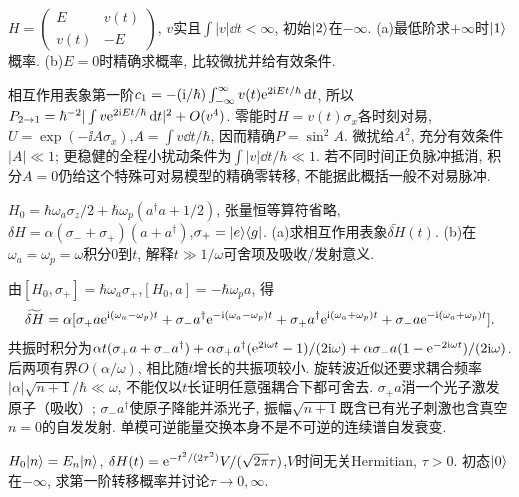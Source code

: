 \begin{exercise}
$H=\left(\begin{smallmatrix}E&v(t)\\v(t)&-E\end{smallmatrix}\right)$, $v$实且$\int|v|\dd t<\infty$, 初始$\lvert 2\rangle$在$-\infty$. (a)最低阶求$+\infty$时$\lvert 1\rangle$概率. (b)$E=0$时精确求概率, 比较微扰并给有效条件.
\end{exercise}
\begin{solution}
相互作用表象第一阶$c_1=-(\mathrm i/\hbar)\int_{-\infty}^\infty v(t)\mathrm e^{2\mathrm i Et/\hbar}\,\mathrm d t$, 所以$P_{2\to1}=\hbar^{-2}|\int v\mathrm e^{2\mathrm i Et/\hbar}\,\mathrm d t|^2+O(v^4)$. 零能时$H=v(t)\sigma_x$各时刻对易, $U=\exp(-\ii A\sigma_x)$,$A=\int v\dd t/\hbar$, 因而精确$P=\sin^2A$. 微扰给$A^2$, 充分有效条件$|A|\ll1$; 更稳健的全程小扰动条件为$\int|v|\dd t/\hbar\ll1$. 若不同时间正负脉冲抵消, 积分$A=0$仍给这个特殊可对易模型的精确零转移, 不能据此概括一般不对易脉冲.
\end{solution}
\begin{exercise}
$H_0=\hbar\omega_a\sigma_z/2+\hbar\omega_p(a^\dagger a+1/2)$, 张量恒等算符省略, $\delta H=\alpha(\sigma_-+\sigma_+)(a+a^\dagger)$,$\sigma_+=\lvert e\rangle\langle g\rvert$. (a)求相互作用表象$\widetilde{\delta H}(t)$. (b)在$\omega_a=\omega_p=\omega$积分$0$到$t$, 解释$t\gg1/\omega$可舍项及吸收/发射意义.
\end{exercise}
\begin{solution}
由$[H_0,\sigma_+]=\hbar\omega_a\sigma_+$,$[H_0,a]=-\hbar\omega_pa$, 得
\[
\widetilde{\delta H}=\alpha[\sigma_+a\mathrm e^{\mathrm i(\omega_a-\omega_p)t}+\sigma_-a^\dagger\mathrm e^{-\mathrm i(\omega_a-\omega_p)t}
+\sigma_+a^\dagger\mathrm e^{\mathrm i(\omega_a+\omega_p)t}+\sigma_-a\mathrm e^{-\mathrm i(\omega_a+\omega_p)t}].
\]
共振时积分为$\alpha t(\sigma_+a+\sigma_-a^\dagger)+\alpha\sigma_+a^\dagger(\mathrm e^{2\mathrm i\omega t}-1)/(2\mathrm i\omega)+\alpha\sigma_-a(1-\mathrm e^{-2\mathrm i\omega t})/(2\mathrm i\omega)$. 后两项有界$O(\alpha/\omega)$, 相比随$t$增长的共振项较小. 旋转波近似还要求耦合频率$|\alpha|\sqrt{n+1}/\hbar\ll\omega$, 不能仅以$t$长证明任意强耦合下都可舍去. $\sigma_+a$消一个光子激发原子（吸收）; $\sigma_-a^\dagger$使原子降能并添光子, 振幅$\sqrt{n+1}$既含已有光子刺激也含真空$n=0$的自发发射. 单模可逆能量交换本身不是不可逆的连续谱自发衰变.
\end{solution}
\begin{exercise}
$H_0\lvert n\rangle=E_n\lvert n\rangle$, $\delta H(t)=\mathrm e^{-t^2/(2\tau^2)}V/(\sqrt{2\pi}\tau)$,$V$时间无关Hermitian, $\tau>0$. 初态$\lvert 0\rangle$在$-\infty$, 求第一阶转移概率并讨论$\tau\to0,\infty$.
\end{exercise}
